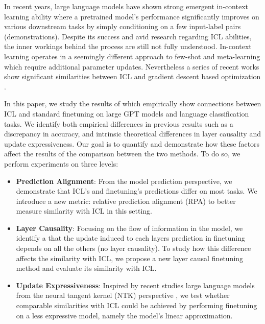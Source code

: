 In recent years, large language models \cite{brown20gpt3} have shown strong emergent in-context learning ability \cite{wei2022emergent} where a pretrained model's performance significantly improves on various downstream tasks by simply conditioning on a few input-label pairs (demonstrations).
Despite its success and avid research regarding ICL abilities, the inner workings behind the process are still not fully understood.
In-context learning operates in a seemingly different approach to few-shot and meta-learning which require additional parameter updates.
Nevertheless a series of recent works show significant similarities between ICL and gradient descent based optimization \cite{irie22dual, pmlr-v202-von-oswald23a, akyürek2023learning}.  

In this paper, we study the results of \cite{dai2023gpt} which empirically show connections between ICL and standard finetuning on large GPT models and language classification tasks.
We identify both empirical differences in previous results such as a discrepancy in accuracy, and intrinsic theoretical differences in layer causality and update expressiveness.
Our goal is to quantify and demonstrate how these factors affect the results of the comparison between the two methods.
To do so, we perform experiments on three levels:
\begin{itemize}
    \item \textbf{Prediction Alignment}: From the model prediction perspective, we demonstrate that ICL's and finetuning's predictions differ on most tasks. 
    We introduce a new metric: relative prediction alignment (RPA) to better measure similarity with ICL in this setting.
    \item \textbf{Layer Causality}: Focusing on the flow of information in the model, we identify a that the update induced to each layers prediction in finetuning depends on all the others (no layer causality).
    To study how this difference affects the similarity with ICL, we propose a new layer causal finetuning method and evaluate its similarity with ICL.
    \item \textbf{Update Expressiveness}: Inspired by recent studies large language models from the neural tangent kernel (NTK) perspective \cite{linearization23},
    we test whether comparable similarities with ICL could be achieved by performing finetuning on a less expressive model, namely the model's linear approximation.
\end{itemize}
